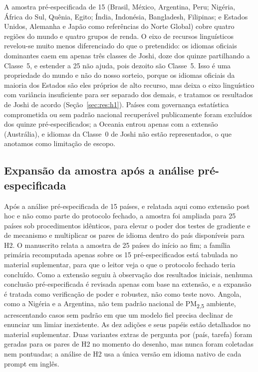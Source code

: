 A amostra pré-especificada de 15 (Brasil, México, Argentina, Peru; Nigéria,
África do Sul, Quênia, Egito; Índia, Indonésia, Bangladesh, Filipinas; e
Estados Unidos, Alemanha e Japão como referências do Norte Global) cobre quatro
regiões do mundo e quatro grupos de renda. O eixo de recursos linguísticos
revelou-se muito menos diferenciado do que o pretendido: os idiomas oficiais
dominantes caem em apenas três classes de Joshi, doze dos quinze partilhando a
Classe~5, e estender a 25 não ajuda, pois dezoito são Classe~5. Isso é uma
propriedade do mundo e não do nosso sorteio, porque os idiomas oficiais da
maioria dos Estados são eles próprios de alto recurso, mas deixa o eixo
linguístico com variância insuficiente para ser separado dos demais, e tratamos
os resultados de Joshi de acordo (Seção~\ref{sec:res:h1}). Países com
governança estatística comprometida ou sem padrão nacional recuperável
publicamente foram excluídos dos quinze pré-especificados; a Oceania entrou
apenas com a extensão (Austrália), e idiomas da Classe~0 de Joshi não estão
representados, o que anotamos como limitação de escopo.

\subsection{Expansão da amostra após a análise pré-especificada}
\label{sec:expansao}

Após a análise pré-especificada de 15 países, e relatada aqui como extensão
post hoc e não como parte do protocolo fechado, a amostra foi ampliada para 25
países sob procedimentos idênticos, para elevar o poder dos testes de gradiente
e de mecanismo e multiplicar os pares de idioma dentro do país disponíveis para
H2. O manuscrito relata a amostra de 25 países do início ao fim; a família
primária recomputada apenas sobre os 15 pré-especificados está tabulada no
material suplementar, para que o leitor veja o que o protocolo fechado teria
concluído. Como a extensão seguiu à observação dos resultados iniciais, nenhuma
conclusão pré-especificada é revisada apenas com base na extensão, e a expansão
é tratada como verificação de poder e robustez, não como teste novo. Angola,
como a Nigéria e a Argentina, não tem padrão nacional de
PM\textsubscript{2,5} ambiente, acrescentando casos sem padrão em que um modelo
fiel precisa declinar de enunciar um limiar inexistente. As dez adições e seus
papéis estão detalhados no material suplementar. Duas variantes extras de
pergunta por (país, tarefa) foram geradas para os pares de H2 no momento do
desenho, mas nunca foram coletadas nem pontuadas; a análise de H2 usa a única
versão em idioma nativo de cada prompt em inglês.

